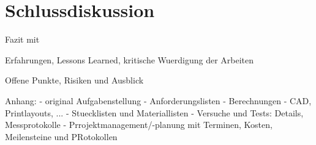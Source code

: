 \section{Schlussdiskussion}

Fazit mit

Erfahrungen, Lessons Learned, kritische Wuerdigung der Arbeiten

Offene Punkte, Risiken und Ausblick

Anhang:
- original Aufgabenstellung
- Anforderungslisten
- Berechnungen
- CAD, Printlayouts, ...
- Stuecklisten und Materiallisten
- Versuche und Tests: Details, Messprotokolle
- Prrojektmanagement/-planung mit Terminen, Kosten, Meilensteine und PRotokollen